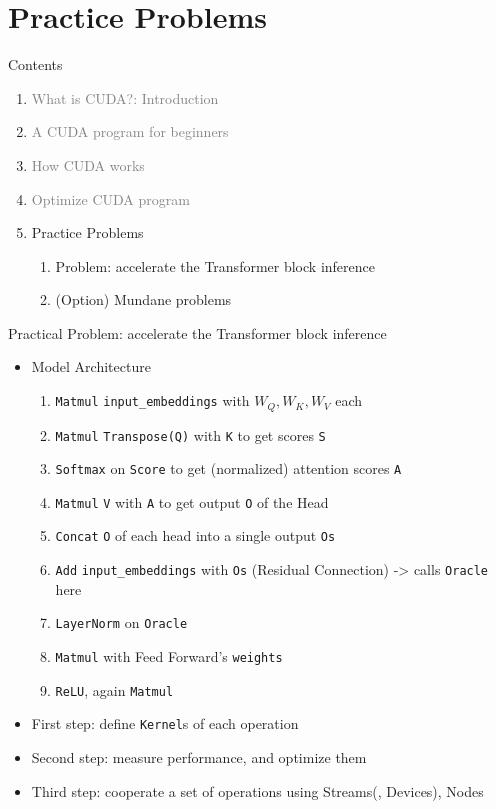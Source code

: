 \documentclass[dvipdfmx, 11pt, aspectratio=169]{beamer}   %
\begin{document}
\section{Practice Problems}
\begin{frame}{Contents}
 \begin{enumerate}   %
   \item \textcolor{gray}{What is CUDA?: Introduction}
   \item \textcolor{gray}{A CUDA program for beginners}
   \item \textcolor{gray}{How CUDA works}
   \item \textcolor{gray}{Optimize CUDA program}
   \item Practice Problems
   \begin{enumerate}
     \item Problem: accelerate the Transformer block inference
     \item (Option) Mundane problems
   \end{enumerate}
 \end{enumerate}
\end{frame}
\begin{frame}{Practical Problem: accelerate the Transformer block inference}
  \begin{itemize}
    \item Model Architecture
    \begin{enumerate}
      \item \lstinline|Matmul| \lstinline|input_embeddings| with $W_Q, W_K, W_V$ each
      \item \lstinline|Matmul| \lstinline|Transpose(Q)| with \lstinline|K| to get scores \lstinline|S|
      \item \lstinline|Softmax| on \lstinline|Score| to get (normalized) attention scores \lstinline|A|
      \item \lstinline|Matmul| \lstinline|V| with \lstinline|A| to get output \lstinline|O| of the Head
      \item \lstinline|Concat| \lstinline|O| of each head into a single output \lstinline|Os|
      \item \lstinline|Add| \lstinline|input_embeddings| with \lstinline|Os| (Residual Connection) -> calls \lstinline|Oracle| here
      \item \lstinline|LayerNorm| on \lstinline|Oracle| 
      \item \lstinline|Matmul| with Feed Forward's \lstinline|weights|
      \item \lstinline|ReLU|, again \lstinline|Matmul|
    \end{enumerate}
    \item First step: define \lstinline|Kernel|s of each operation
    \item Second step: measure performance, and optimize them
    \item Third step: cooperate a set of operations using Streams(, Devices), Nodes
  \end{itemize}
\end{frame}
\end{document}
